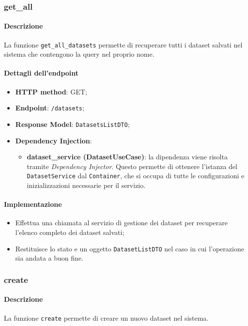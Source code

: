 \label{subsubsec:funzioni_dataset}
\subsubsection{get\_all}
\paragraph{Descrizione}
La funzione \texttt{get\_all\_datasets} permette di recuperare tutti i dataset salvati nel sistema che contengono la query nel proprio nome.
\paragraph{Dettagli dell'endpoint}
\begin{itemize}
    \item \textbf{HTTP method}: GET;
    \item \textbf{Endpoint}: \texttt{/datasets};
    \item \textbf{Response Model}: \texttt{DatasetsListDTO};
    \item \textbf{Dependency Injection}: 
    \begin{itemize}
    \item \textbf{dataset\_service (DatasetUseCase)}: la dipendenza viene risolta tramite \textit{Dependency Injector}. Questo permette di ottenere l'istanza del \texttt{DatasetService} dal \texttt{Container}, che si occupa di tutte le configurazioni e inizializzazioni necessarie per il servizio.
    \end{itemize}
\end{itemize}
\paragraph{Implementazione}
\begin{itemize}
    \item Effettua una chiamata al servizio di gestione dei dataset per recuperare l'elenco completo dei dataset salvati;
    \item Restituisce lo stato e un oggetto \texttt{DatasetListDTO} nel caso in cui l'operazione sia andata a buon fine.
\end{itemize}

\subsubsection{create}
\paragraph{Descrizione}
La funzione \texttt{create} permette di creare un nuovo dataset nel sistema.
